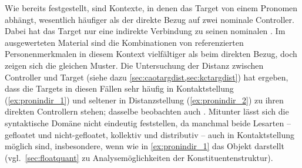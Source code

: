 Wie bereits festgestellt, sind Kontexte, in denen das Target  von
einem Pronomen abhängt, wesentlich häufiger als der direkte Bezug auf zwei
nominale Controller. Dabei hat das Target nur eine indirekte Verbindung zu
seinen nominalen . Im ausgewerteten Material sind die
Kombinationen von referenzierten Personenmerkmalen in diesem Kontext
vielfältiger als beim direkten Bezug, doch zeigen sich die gleichen Muster. Die
Untersuchung der Distanz zwischen Controller und Target (siehe dazu
\cref{sec:caotargdist,sec:kctargdist}) hat ergeben, dass die Targets in diesen
Fällen sehr häufig in Kontaktstellung (\ref{ex:pronindir_1}) und seltener in
Distanzstellung (\ref{ex:pronindir_2}) zu ihren direkten Controllern stehen;
dasselbe beobachten auch \citet[624]{ksw2}. Mitunter lässt sich die
syntaktische Domäne nicht eindeutig feststellen, da manchmal beide Lesarten --
gefloatet und nicht-gefloatet, kollektiv und distributiv -- auch in
Kontaktstellung möglich sind, insbesondere, wenn  wie in
\cref{ex:pronindir_1} das Objekt darstellt (vgl.~\cref{sec:floatquant} zu
Analysemöglichkeiten der Konstituentenstruktur).

